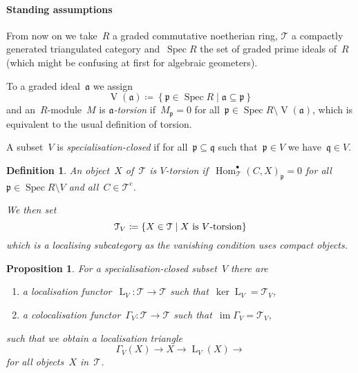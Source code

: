 \documentclass[10pt,a4paper]{article}
\theoremstyle{lecture}
\newtheorem{definition}[theorem]{Definition}
\newtheorem{proposition}[theorem]{Proposition}
\newcommand\dash{\nobreakdash-\hspace{0pt}}
\newcommand\cc{\ensuremath{\mathrm{c}}}
\DeclareMathOperator\Hom{Hom}
\DeclareMathOperator\image{im}
\DeclareMathOperator\LL{L}
\DeclareMathOperator\Spec{Spec}
\DeclareMathOperator\VV{V}
\begin{document}
\paragraph{Standing assumptions} From now on we take~$R$ a graded commutative noetherian ring, $\mathcal{T}$ a compactly generated triangulated category and~$\Spec R$ the set of graded prime ideals of~$R$ (which might be confusing at first for algebraic geometers).

To a graded ideal~$\mathfrak{a}$ we assign
\begin{equation}
  \VV(\mathfrak{a})\coloneqq\left\{ \mathfrak{p}\in\Spec R\mid\mathfrak{a}\subseteq\mathfrak{p} \right\}
\end{equation}
and an~$R$\dash module~$M$ is \emph{$\mathfrak{a}$\dash torsion} if~$M_{\mathfrak{p}}=0$ for all~$\mathfrak{p}\in\Spec R\setminus\VV(\mathfrak{a})$, which is equivalent to the usual definition of torsion.

A subset~$V$ is \emph{specialisation-closed} if for all~$\mathfrak{p}\subseteq\mathfrak{q}$ such that~$\mathfrak{p}\in V$ we have~$\mathfrak{q}\in V$.

\begin{definition}
  An object~$X$ of~$\mathcal{T}$ is \emph{$V$\dash torsion} if~$\Hom_{\mathcal{T}}^\bullet(C,X)_{\mathfrak{p}}=0$ for all~$\mathfrak{p}\in\Spec R\setminus V$ and all~$C\in\mathcal{T}^\cc$.

  We then set
  \begin{equation}
    \mathcal{T}_V\coloneqq\left\{ X\in\mathcal{T}\mid\text{$X$ is $V$\dash torsion} \right\}
  \end{equation}
  which is a localising subcategory as the vanishing condition uses compact objects.
\end{definition}

\begin{proposition}
  For a specialisation-closed subset~$V$ there are
  \begin{enumerate}
    \item a localisation functor~$\LL_V\colon\mathcal{T}\to\mathcal{T}$ such that~$\ker\LL_V=\mathcal{T}_V$,
    \item a colocalisation functor~$\Gamma_V\colon\mathcal{T}\to\mathcal{T}$ such that~$\image\Gamma_V=\mathcal{T}_V$,
  \end{enumerate}
  such that we obtain a \emph{localisation triangle}
  \begin{equation}
    \Gamma_V(X)\to X\to\LL_V(X)\to
  \end{equation}
  for all objects~$X$ in~$\mathcal{T}$.
\end{proposition}
\end{document}
